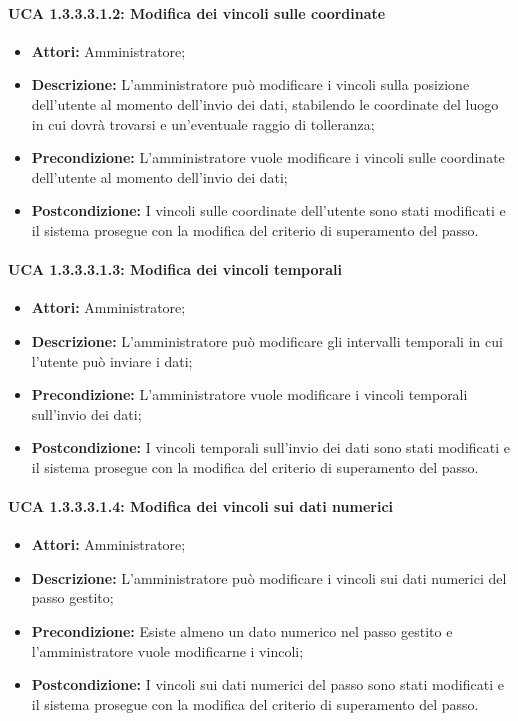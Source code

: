 \paragraph{UCA 1.3.3.3.1.2: Modifica dei vincoli sulle coordinate}
\begin{itemize}
\item \textbf{Attori:}
 Amministratore;
\item \textbf{Descrizione:} 
L'amministratore può modificare i vincoli sulla posizione dell'utente al momento dell'invio dei dati, stabilendo le coordinate del luogo in cui dovrà trovarsi e un'eventuale raggio di tolleranza;
\item \textbf{Precondizione:} 
L'amministratore vuole modificare i vincoli sulle coordinate dell'utente al momento dell'invio dei dati;
\item \textbf{Postcondizione:} 
I vincoli sulle coordinate dell'utente sono stati modificati e il sistema prosegue con la modifica del criterio di superamento del passo.
\end{itemize}

\paragraph{UCA 1.3.3.3.1.3: Modifica dei vincoli temporali}
\begin{itemize}
\item \textbf{Attori:}
 Amministratore;
\item \textbf{Descrizione:} 
L'amministratore può modificare gli intervalli temporali in cui l'utente può inviare i dati;
\item \textbf{Precondizione:} 
L'amministratore vuole modificare i vincoli temporali sull'invio dei dati;
\item \textbf{Postcondizione:} 
I vincoli temporali sull'invio dei dati sono stati modificati e il sistema prosegue con la modifica del criterio di superamento del passo.
\end{itemize}

\paragraph{UCA 1.3.3.3.1.4: Modifica dei vincoli sui dati numerici}
\begin{itemize}
\item \textbf{Attori:}
 Amministratore;
\item \textbf{Descrizione:} 
L'amministratore può modificare i vincoli sui dati numerici del passo gestito;
\item \textbf{Precondizione:} 
Esiste almeno un dato numerico nel passo gestito e l'amministratore vuole modificarne i vincoli;
\item \textbf{Postcondizione:} 
I vincoli sui dati numerici del passo sono stati modificati e il sistema prosegue con la modifica del criterio di superamento del passo.
\end{itemize}

